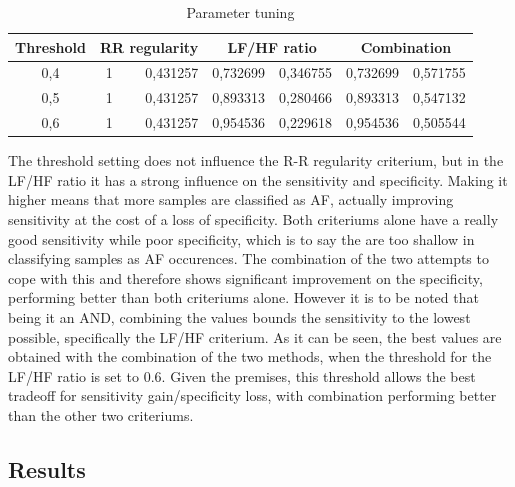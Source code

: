 \documentclass[a4paper,titlepage]{article}
\begin{document}
\begin{table}[htbp]
  \centering
  \caption{Parameter tuning}
    \begin{tabular}{c |rr|rr|rr|}
    \multicolumn{1}{c|}{Threshold} & \multicolumn{2}{c|}{RR regularity} & \multicolumn{2}{c|}{LF/HF ratio} & \multicolumn{2}{c|}{Combination} \\ \hline
    0,4   & 1     & 0,431257 & 0,732699 & 0,346755 & 0,732699 & 0,571755 \\
    0,5   & 1     & 0,431257 & 0,893313 & 0,280466 & 0,893313 & 0,547132 \\
    0,6   & 1     & 0,431257 & 0,954536 & 0,229618 & 0,954536 & 0,505544 \\
    \end{tabular}%
  \label{tab:addlabel}%
\end{table}%

The threshold setting does not influence the R-R regularity criterium, but in the LF/HF ratio it has a strong influence on the sensitivity and specificity. Making it higher means that more samples are classified as AF, actually improving sensitivity at the cost of a loss of specificity.
Both criteriums alone have a really good sensitivity while poor specificity, which is to say the are too shallow in classifying samples as AF occurences. The combination of the two attempts to cope with this and therefore shows significant improvement on the specificity, performing better than both criteriums alone. However it is to be noted that being it an AND, combining the values bounds the sensitivity to the lowest possible, specifically the LF/HF criterium.
As it can be seen, the best values are obtained with the combination of the two methods, when the threshold for the LF/HF ratio is set to 0.6.  Given the premises, this threshold allows the best tradeoff for sensitivity gain/specificity loss, with combination performing better than the other two criteriums.

\subsection{Results}
\end{document}
